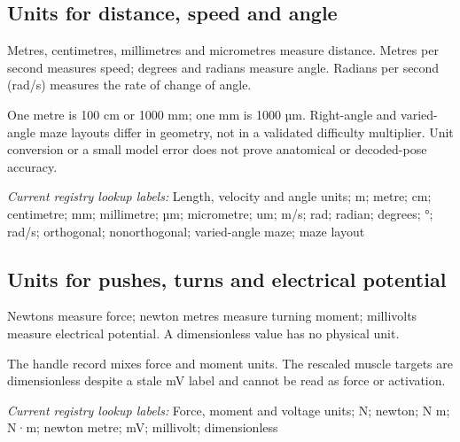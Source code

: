 \begin{samepage}
\subsection*{Units for distance, speed and angle}
\noindent Metres, centimetres, millimetres and micrometres measure distance. Metres per second measures speed; degrees and radians measure angle. Radians per second (rad/s) measures the rate of change of angle.\par
\end{samepage}
\begin{samepage}
\noindent One metre is 100 cm or 1000 mm; one mm is 1000 µm. Right-angle and varied-angle maze layouts differ in geometry, not in a validated difficulty multiplier. Unit conversion or a small model error does not prove anatomical or decoded-pose accuracy.\par\nopagebreak[4]

\end{samepage}


\noindent\textit{Current registry lookup labels:} Length, velocity and angle units; m; metre; cm; centimetre; mm; millimetre; µm; micrometre; um; m/s; rad; radian; degrees; °; rad/s; orthogonal; nonorthogonal; varied-angle maze; maze layout\par

\begin{samepage}
\subsection*{Units for pushes, turns and electrical potential}
\noindent Newtons measure force; newton metres measure turning moment; millivolts measure electrical potential. A dimensionless value has no physical unit.\par
\end{samepage}
\begin{samepage}
\noindent The handle record mixes force and moment units. The rescaled muscle targets are dimensionless despite a stale mV label and cannot be read as force or activation.\par\nopagebreak[4]

\end{samepage}


\noindent\textit{Current registry lookup labels:} Force, moment and voltage units; N; newton; N m; N·m; newton metre; mV; millivolt; dimensionless\par

